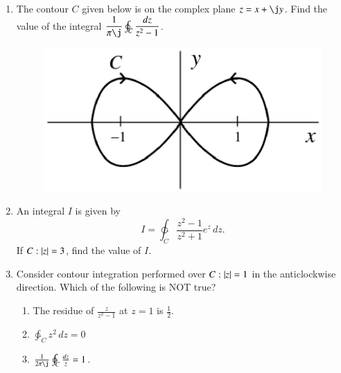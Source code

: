 \documentclass[journal,12pt,twocolumn]{IEEEtran}
\begin{document}
%
%
\renewcommand{\thefigure}{\theenumi}
\begin{enumerate}[1.]
\item The contour $C$ given below is on the complex plane $z = x + \j y$.
Find the value of the integral $\dfrac{1}{\pi\j}\oint_{C}\dfrac{dz}{z^2-1}$.
%
\begin{figure}[!h]
\centering
\includegraphics[width=\columnwidth]{./figs/ec2018.eps}
\caption{}
\label{fig:ec2018}
\end{figure}
\item An integral $I$  is given by 
\begin{equation}
I = \ointctrclockwise_{C}\frac{z^2-1}{z^2+1} e^z\,dz.
\end{equation}
If $C: \left\vert z\right\vert = 3$, find the value of $I$.
\item Consider contour integration performed over $C:\left\vert z\right\vert = 1$ in the anticlockwise direction.  Which of the following is
NOT true?
\begin{enumerate}
\setlength\itemsep{0.5em}
\item The residue of $\frac{z}{z^2-1}$ at $z = 1$ is $\frac{1}{2}$.
\item $\ointctrclockwise_{C}z^2\,dz = 0$
\item $\frac{1}{2\pi\j}\ointctrclockwise_{C}\frac{dz}{z}= 1$.

\end{enumerate}
\end{enumerate}
\end{document}
